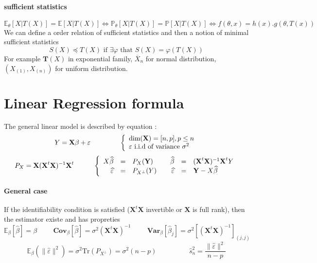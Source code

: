\documentclass[a4paper,10pt]{article}
\begin{document}
\paragraph{sufficient statistics}
\[
\mathbb{E}_{\theta}[X|T(X)] = \mathbb{E}[X|T(X)]  \Longleftrightarrow
\mathbb{P}_{\theta}[X|T(X)] = \mathbb{P}[X|T(X)]  \Longleftrightarrow 
f(\theta, x) = h(x).g(\theta, T(x))
\]
We can define a order relation of sufficient statistics and then a notion of minimal sufficient statistics
\[
S(X) \preccurlyeq T(X) \text{ if } \exists \varphi \text{ that } S(X) = \varphi(T(X))
\]
For example $\textbf{T}(X)$ in exponential family, $\overline{X}_n$ for normal distribution, $(X_{(1)},X_{(n)})$ for uniform distribution. 

\section{Linear Regression formula}
The general linear model is described by equation :
\[
Y = \textbf{X} \beta + \varepsilon    
\hspace{1.5cm} 
\left\{
\begin{array}{l}
 \text{dim}(\textbf{X})=[n,p] , p\leq n \\
 \varepsilon \text{  i.i.d of variance }\sigma^2
\end{array}\right. 
\]
\[
P_{X} = \textbf{X}(\textbf{X}^t \textbf{X})^{-1} \textbf{X}^t
\hspace{10mm}
\left\{
\begin{array}{rclcrcl}
X\widehat{\beta} &=& P_{X}(\textbf{Y}) 
& &
\widehat{\beta} &=& (\textbf{X}^t \textbf{X})^{-1} \textbf{X}^t Y \\
\widehat{\varepsilon} &=& P_{X^\bot}(Y)
& &
\widehat{\varepsilon} &=& \textbf{Y} - X\widehat{\beta}
\end{array}\right. 
\]

\paragraph{General case} If the identifiability condition is satisfied ($\textbf{X}^t \textbf{X}$ invertible or $\textbf{X}$ is full rank), then the estimator existe and has propreties
\[
\mathbb{E}_{\beta}[\widehat{\beta}] = \beta
\hspace{1cm}
\textbf{Cov}_{\beta}[\widehat{\beta}] = \sigma^2 (\textbf{X}^t \textbf{X})^{-1}
\hspace{1cm}
\textbf{Var}_{\beta}[\widehat{\beta}_j] = \sigma^2 [(\textbf{X}^t \textbf{X})^{-1}]_{(j,j)}
\]
\[
\mathbb{E}_{\beta} (\|\widehat{\varepsilon}\|^2) = \sigma^2\text{Tr}(P_{X^\bot})=\sigma^2(n-p)
\hspace{2cm}
\widehat{s}^2_n = \frac{\|\widehat{\varepsilon}\|^2}{n-p}
\]
\end{document}
